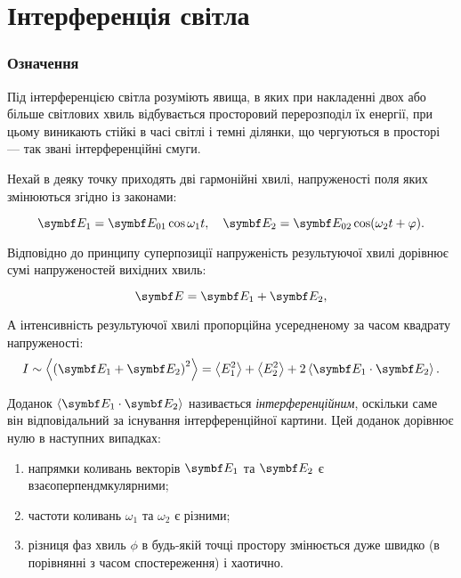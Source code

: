 
\part{Інтерференція світла}

\nocite{akhmanov, Godzhaev}
\printbibliography[title={Рекомендована література}, heading=subbibliography]

\section{Означення}

Під інтерференцією світла розуміють явища, в яких при накладенні двох або більше світлових хвиль відбувається просторовий перерозподіл їх енергії, при цьому виникають стійкі в часі світлі і темні ділянки, що чергуються в просторі --- так звані інтерференційні смуги. 

Нехай в деяку точку приходять дві гармонійні хвилі, напруженості поля яких змінюються згідно із законами:

\begin{equation}\label{eq:EField}
    \vect{E}_1 = \vect{E}_{01}\cos\omega_1 t, \quad \vect{E}_2 = \vect{E}_{02}\cos(\omega_2 t + \phi).
\end{equation}

Відповідно до принципу суперпозиції напруженість результуючої хвилі дорівнює сумі напруженостей вихідних хвиль:

\begin{equation*}
    \vect{E} = \vect{E}_1 + \vect{E}_2,
\end{equation*}

А інтенсивність результуючої хвилі  пропорційна усередненому за часом квадрату напруженості:
\begin{equation}\label{eq:Intens}
    I \sim \left\langle\left(  \vect{E}_1 + \vect{E}_2\right)^2  \right\rangle  = \left\langle E_1^2\right\rangle + \left\langle E_2^2\right\rangle  + 2\left\langle \vect{E}_1 \cdot \vect{E}_2 \right\rangle.
\end{equation}

Доданок $\left\langle \vect{E}_1 \cdot \vect{E}_2 \right\rangle$ називається \emph{інтерференційним}, оскільки саме він відповідальний за існування інтерференційної картини. Цей доданок дорівнює нулю в наступних випадках:
\begin{enumerate}
    \item напрямки коливань векторів $\vect{E}_1 $ та $\vect{E}_2 $ є взаєоперпендмкулярними;
    \item частоти коливань $\omega_1$ та  $\omega_2$ є різними;
    \item різниця фаз хвиль $\phi$ в будь-якій точці простору змінюється дуже швидко (в  порівнянні з часом спостереження) і хаотично.
\end{enumerate}

